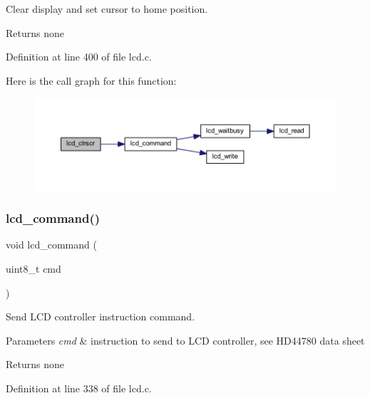 Clear display and set cursor to home position. 

\begin{DoxyReturn}{Returns}
none 
\end{DoxyReturn}


Definition at line 400 of file lcd.\+c.

Here is the call graph for this function\+:\nopagebreak
\begin{figure}[H]
\begin{center}
\leavevmode
\includegraphics[width=350pt]{group__pfleury__lcd_gaf8da853dba4b9d5f2aea4e294444e14d_cgraph}
\end{center}
\end{figure}
\mbox{\label{group__pfleury__lcd_gaea9d14f02df06f948cb5a56776980826}} 
\subsubsection{\texorpdfstring{lcd\_command()}{lcd\_command()}}
{\footnotesize\ttfamily void lcd\+\_\+command (\begin{DoxyParamCaption}\item[{uint8\+\_\+t}]{cmd }\end{DoxyParamCaption})}



Send L\+CD controller instruction command. 


\begin{DoxyParams}{Parameters}
{\em cmd} & instruction to send to L\+CD controller, see H\+D44780 data sheet \\
\hline
\end{DoxyParams}
\begin{DoxyReturn}{Returns}
none 
\end{DoxyReturn}


Definition at line 338 of file lcd.\+c.

